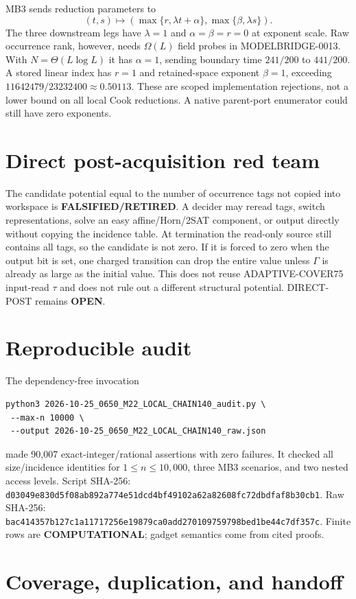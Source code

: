 \documentclass[11pt]{article}
\newcommand{\OPEN}{\textbf{OPEN}}
\newcommand{\RETIRED}{\textbf{FALSIFIED/RETIRED}}
\newcommand{\COMP}{\textbf{COMPUTATIONAL}}
\begin{document}
MB3 sends reduction parameters to
\[
(t,s)\mapsto
\left(\max\{r,\lambda t+\alpha\},
\max\{\beta,\lambda s\}\right).
\]
The three downstream legs have $\lambda=1$ and
$\alpha=\beta=r=0$ at exponent scale.  Raw occurrence rank, however, needs
$\Omega(L)$ field probes in MODELBRIDGE-0013.  With
$N=\Theta(L\log L)$ it has $\alpha=1$, sending boundary time $241/200$ to
$441/200$.  A stored linear index has $r=1$ and retained-space exponent
$\beta=1$, exceeding $11642479/23232400\approx0.50113$.  These are scoped
implementation rejections, not a lower bound on all local Cook reductions.
A native parent-port enumerator could still have zero exponents.

\section{Direct post-acquisition red team}

The candidate potential equal to the number of occurrence tags not copied
into workspace is \RETIRED.  A decider may reread tags, switch
representations, solve an easy affine/Horn/2SAT component, or output directly
without copying the incidence table.  At termination the read-only source
still contains all tags, so the candidate is not zero.  If it is forced to
zero when the output bit is set, one charged transition can drop the entire
value unless $\Gamma$ is already as large as the initial value.  This does
not reuse ADAPTIVE-COVER75 input-read $\tau$ and does not rule out a
different structural potential.  DIRECT-POST remains \OPEN.

\section{Reproducible audit}

The dependency-free invocation
\begin{verbatim}
python3 2026-10-25_0650_M22_LOCAL_CHAIN140_audit.py \
 --max-n 10000 \
 --output 2026-10-25_0650_M22_LOCAL_CHAIN140_raw.json
\end{verbatim}
made 90,007 exact-integer/rational assertions with zero failures.  It checked
all size/incidence identities for $1\le n\le10{,}000$, three MB3 scenarios,
and two nested access levels.  Script SHA-256:
\nolinkurl{d03049e830d5f08ab892a774e51dcd4bf49102a62a82608fc72dbdfaf8b30cb1}.
Raw SHA-256:
\nolinkurl{bac414357b127c1a11717256e19879ca0add270109759798bed1be44c7df357c}.
Finite rows are \COMP; gadget semantics come from cited proofs.

\section{Coverage, duplication, and handoff}
\end{document}

